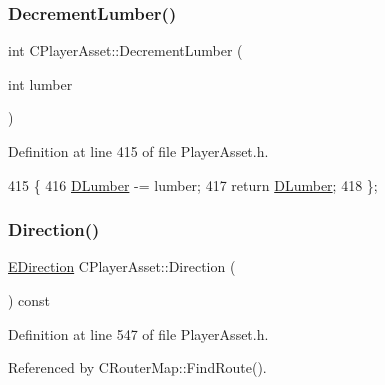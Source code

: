 \subsubsection{\texorpdfstring{Decrement\+Lumber()}{DecrementLumber()}}
{\footnotesize\ttfamily int C\+Player\+Asset\+::\+Decrement\+Lumber (\begin{DoxyParamCaption}\item[{int}]{lumber }\end{DoxyParamCaption})\hspace{0.3cm}{\ttfamily [inline]}}



Definition at line 415 of file Player\+Asset.\+h.


\begin{DoxyCode}
415                                        \{
416             \hyperlink{classCPlayerAsset_af726ea7df9596f02cdb1428d61186349}{DLumber} -= lumber;
417             \textcolor{keywordflow}{return} \hyperlink{classCPlayerAsset_af726ea7df9596f02cdb1428d61186349}{DLumber};
418         \};
\end{DoxyCode}
\hypertarget{classCPlayerAsset_add74a452e9a030ae0d04d4281d964935}{}\label{classCPlayerAsset_add74a452e9a030ae0d04d4281d964935} 
\subsubsection{\texorpdfstring{Direction()}{Direction()}\hspace{0.1cm}{\footnotesize\ttfamily [1/2]}}
{\footnotesize\ttfamily \hyperlink{GameDataTypes_8h_acb2b033915f6659a71a38b5aa6e4eb42}{E\+Direction} C\+Player\+Asset\+::\+Direction (\begin{DoxyParamCaption}{ }\end{DoxyParamCaption}) const\hspace{0.3cm}{\ttfamily [inline]}}



Definition at line 547 of file Player\+Asset.\+h.



Referenced by C\+Router\+Map\+::\+Find\+Route().


